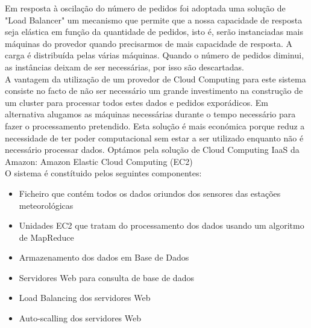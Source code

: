 Em resposta à oscilação do número de pedidos foi adoptada uma solução de "Load Balancer" um mecanismo que permite que a nossa capacidade de resposta seja elástica em função da quantidade de pedidos, isto é, serão instanciadas mais máquinas do provedor quando precisarmos de mais capacidade de resposta. A carga é distribuída pelas várias máquinas. Quando o número de pedidos diminui, as instâncias deixam de ser necessárias, por isso são descartadas.  \\
A vantagem da utilização de um provedor de  Cloud Computing para este  sistema  consiste no facto de não ser necessário um grande investimento na construção de um cluster para processar todos estes dados e pedidos exporádicos. Em alternativa alugamos as máquinas necessárias durante o tempo necessário para fazer o processamento pretendido. Esta solução é mais económica porque reduz a necessidade de ter poder computacional sem estar a ser utilizado enquanto não é necessário processar dados. Optámos pela solução de Cloud Computing IaaS da Amazon: Amazon Elastic Cloud Computing (EC2)\\

O sistema é constítuido pelos seguintes componentes:
   \begin{itemize}
\item Ficheiro que contém todos os dados oriundos dos sensores das estações meteorológicas 
\item Unidades EC2 que tratam do processamento dos dados usando um algoritmo de MapReduce
\item Armazenamento dos dados em Base de Dados
\item Servidores Web para consulta de base de dados
\item Load Balancing dos servidores Web
\item Auto-scalling dos servidores Web
\end{itemize}








